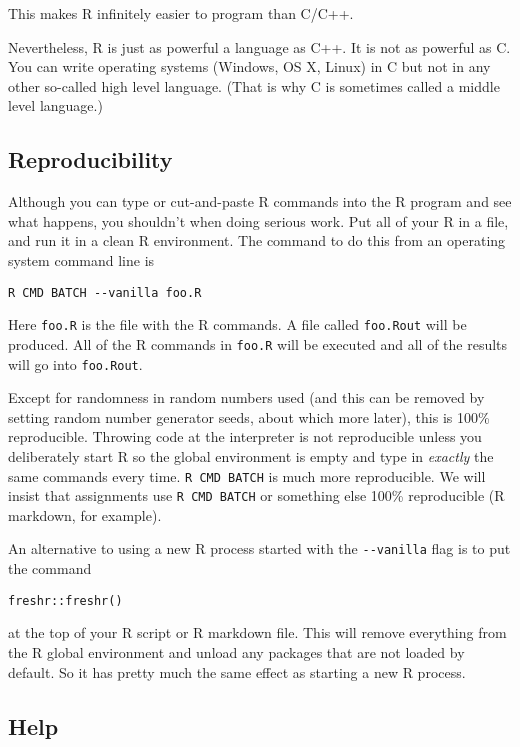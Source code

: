 \documentclass[
]{article}
\begin{document}
This makes R infinitely easier to program than C/C++.

Nevertheless, R is just as powerful a language as C++. It is not as
powerful as C. You can write operating systems (Windows, OS X, Linux) in
C but not in any other so-called high level language. (That is why C is
sometimes called a middle level language.)

\hypertarget{reproducibility}{%
\subsection{Reproducibility}\label{reproducibility}}

Although you can type or cut-and-paste R commands into the R program and
see what happens, you shouldn't when doing serious work. Put all of your
R in a file, and run it in a clean R environment. The command to do this
from an operating system command line is

\begin{verbatim}
R CMD BATCH --vanilla foo.R
\end{verbatim}

Here \texttt{foo.R} is the file with the R commands. A file called
\texttt{foo.Rout} will be produced. All of the R commands in
\texttt{foo.R} will be executed and all of the results will go into
\texttt{foo.Rout}.

Except for randomness in random numbers used (and this can be removed by
setting random number generator seeds, about which more later), this is
100\% reproducible. Throwing code at the interpreter is not reproducible
unless you deliberately start R so the global environment is empty and
type in \emph{exactly} the same commands every time.
\texttt{R\ CMD\ BATCH} is much more reproducible. We will insist that
assignments use \texttt{R\ CMD\ BATCH} or something else 100\%
reproducible (R markdown, for example).

An alternative to using a new R process started with the
\texttt{-\/-vanilla} flag is to put the command

\begin{verbatim}
freshr::freshr()
\end{verbatim}

at the top of your R script or R markdown file. This will remove
everything from the R global environment and unload any packages that
are not loaded by default. So it has pretty much the same effect as
starting a new R process.

\hypertarget{help}{%
\subsection{Help}\label{help}}
\end{document}
